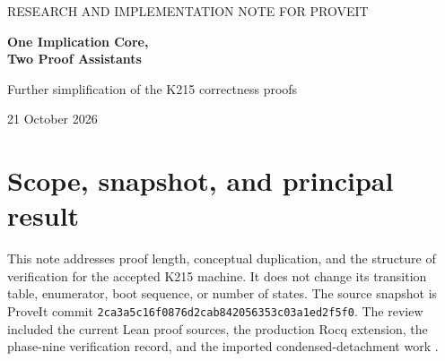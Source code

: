 \documentclass[11pt,letterpaper]{article}
\newcommand{\sha}{\texttt{2ca3a5c16f0876d2cab842056353c03a1ed2f5f0}}
\begin{document}
\begin{center}
{\color{teal}\small RESEARCH AND IMPLEMENTATION NOTE FOR PROVEIT}\par\vspace{7pt}
{\color{navy}\LARGE\bfseries One Implication Core,\\[3pt] Two Proof Assistants}\par\vspace{9pt}
{\large Further simplification of the K215 correctness proofs}\par\vspace{7pt}
{21 October 2026}
\end{center}

\begin{abstract}
The current repository already contains a 58-step representation-independent
proof recovering unrestricted implication from the dominated row. The most
useful next simplification is to reuse that proof more broadly. A separate Lean
module still contains 106 modus-ponens steps deriving the ordinary implicational
basis. We replace that second development by an adapter to the shared core and a
five-step derivation of the missing S axiom. The two developments therefore use
63 shared modus-ponens steps instead of 164. Their maintained source shrinks from
42,715 to 18,668 bytes, including the new adapter. The pure Lean theorems have no
axiom dependencies.

We also supply a checked Rocq implementation of the same generic core, its
numerical compatibility adapter, and a checked Lean refactoring that separates
semantic site contracts from the executable site checker. The latter is a
necessary interface for replacing repeated per-occurrence execution by shared
primitive proofs. It preserves the old Boolean-checker API and adds a simulation
theorem which needs semantic contracts alone. All claims are pinned to an exact
repository revision and separated from the full endpoint rebuild and primitive
factoring work that remains to be done.
\end{abstract}

\section{Scope, snapshot, and principal result}

This note addresses proof length, conceptual duplication, and the structure of
verification for the accepted K215 machine. It does not change its transition
table, enumerator, boot sequence, or number of states. The source snapshot is
ProveIt commit \sha. The review included the current Lean proof sources, the
production Rocq extension, the phase-nine verification record, and the imported
condensed-detachment work \cite{snapshot,verification,phase9,rho8cd}.
\end{document}
